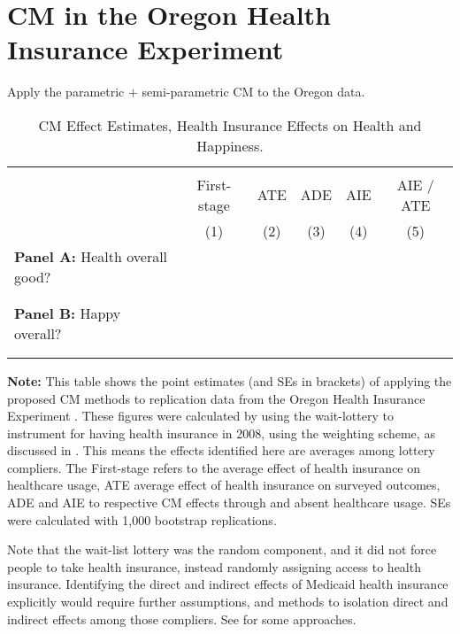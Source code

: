 \section{CM in the Oregon Health Insurance Experiment}
\label{sec:oregon}

Apply the parametric $+$ semi-parametric CM to the Oregon data.


\begin{table}[!h]
    \singlespacing
    \centering
    \small
    \caption{CM Effect Estimates, Health Insurance Effects on Health and Happiness.}
    \begin{tabular}{l c c c c c}
        \\[-1.8ex]\hline \hline \\[-1.8ex] 
        & First-stage & ATE & ADE & AIE & AIE / ATE \\
        \cmidrule(lr){2-6}
        & (1) & (2) & (3) & (4) & (5) \\
        \midrule
        \multicolumn{1}{l}{\textbf{Panel A:} Health overall good?} \\
        
        \\[-1.8ex]\hline \\[-1.8ex]
        \multicolumn{1}{l}{\textbf{Panel B:} Happy overall?} \\
        
        \\[-1.8ex]\hline \\[-1.8ex]
    \end{tabular}
    \vspace{-0.125cm}
    \label{tab:cm-oregon}
    \justify
    \footnotesize
    \textbf{Note:}
    This table shows the point estimates (and SEs in brackets) of applying the proposed CM methods to replication data from the Oregon Health Insurance Experiment \citep{icspr2014oregon}.
    These figures were calculated by using the wait-lottery to instrument for having health insurance in 2008, using the \cite{abadie2003semiparametric} weighting scheme, as discussed in .
    This means the effects identified here are averages among lottery compliers.
    The First-stage refers to the average effect of health insurance on healthcare usage, ATE average effect of health insurance on surveyed outcomes, ADE and AIE to respective CM effects through and absent healthcare usage.
    SEs were calculated with 1,000 bootstrap replications.
\end{table}

Note that the wait-list lottery was the random component, and it did not force people to take health insurance, instead randomly assigning access to health insurance.
Identifying the direct and indirect effects of Medicaid health insurance explicitly would require further assumptions, and methods to isolation direct and indirect effects among those compliers.
See \cite{frolich2007nonparametric} for some approaches.
